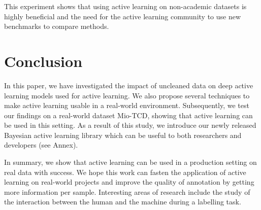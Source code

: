 \documentclass{article}
\begin{document}

This experiment shows that using active learning on non-academic datasets is highly beneficial and the need for the active learning community to use new benchmarks to compare methods.





\section{Conclusion}

In this paper, we have investigated the impact of uncleaned data on deep active learning models used for active learning. We also propose several techniques to make active learning usable in a real-world environment. Subsequently, we test our findings on a real-world dataset Mio-TCD, showing that active learning can be used in this setting.  As a result of this study, we introduce our newly released Bayesian active learning library which can be useful to both researchers and developers (see Annex).


In summary, we show that active learning can be used in a production setting on real data with success. We hope this work can fasten the application of active learning on real-world projects and improve the quality of annotation by getting more information per sample. Interesting areas of research include the study of the interaction between the human and the machine during a labelling task.

\clearpage


\appendix

\end{document}
